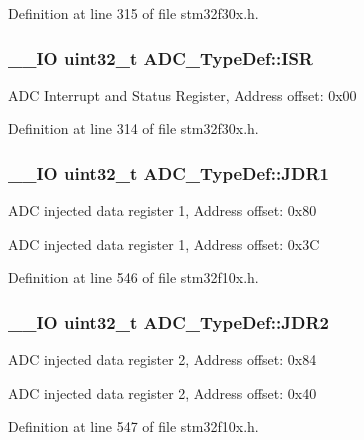 Definition at line 315 of file stm32f30x.\-h.

\hypertarget{struct_a_d_c___type_def_add06351bbb4cf771125247d62b145d75}{
\subsubsection[{I\-S\-R}]{\setlength{\rightskip}{0pt plus 5cm}\-\_\-\-\_\-\-I\-O {\bf uint32\-\_\-t} A\-D\-C\-\_\-\-Type\-Def\-::\-I\-S\-R}}\label{struct_a_d_c___type_def_add06351bbb4cf771125247d62b145d75}
A\-D\-C Interrupt and Status Register, Address offset\-: 0x00 

Definition at line 314 of file stm32f30x.\-h.

\hypertarget{struct_a_d_c___type_def_ab4b0a79a9e4a9d5b0a24d7285cf55bdc}{
\subsubsection[{J\-D\-R1}]{\setlength{\rightskip}{0pt plus 5cm}\-\_\-\-\_\-\-I\-O {\bf uint32\-\_\-t} A\-D\-C\-\_\-\-Type\-Def\-::\-J\-D\-R1}}\label{struct_a_d_c___type_def_ab4b0a79a9e4a9d5b0a24d7285cf55bdc}
A\-D\-C injected data register 1, Address offset\-: 0x80

A\-D\-C injected data register 1, Address offset\-: 0x3\-C 

Definition at line 546 of file stm32f10x.\-h.

\hypertarget{struct_a_d_c___type_def_a898b87cab4f099bcca981cc4c9318b51}{
\subsubsection[{J\-D\-R2}]{\setlength{\rightskip}{0pt plus 5cm}\-\_\-\-\_\-\-I\-O {\bf uint32\-\_\-t} A\-D\-C\-\_\-\-Type\-Def\-::\-J\-D\-R2}}\label{struct_a_d_c___type_def_a898b87cab4f099bcca981cc4c9318b51}
A\-D\-C injected data register 2, Address offset\-: 0x84

A\-D\-C injected data register 2, Address offset\-: 0x40 

Definition at line 547 of file stm32f10x.\-h.

